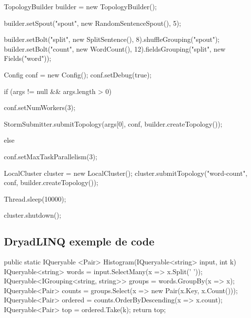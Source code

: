\begin{code}[Java]
{{        TopologyBuilder builder = new TopologyBuilder();

        builder.setSpout("spout", new RandomSentenceSpout(), 5);

        builder.setBolt("split", new SplitSentence(), 8).shuffleGrouping("spout");
        builder.setBolt("count", new WordCount(), 12).fieldsGrouping("split", new Fields("word"));

        Config conf = new Config();
        conf.setDebug(true);


        if (args != null && args.length > 0) {
          conf.setNumWorkers(3);

          StormSubmitter.submitTopology(args[0], conf, builder.createTopology());
        }
        else {
          conf.setMaxTaskParallelism(3);

          LocalCluster cluster = new LocalCluster();
          cluster.submitTopology("word-count", conf, builder.createTopology());

          Thread.sleep(10000);

          cluster.shutdown();
        }
      }
    }
  \end{code}

  \subsection{DryadLINQ exemple de code}
  \begin{code}[C]
    public static IQueryable <Pair> Histogram(IQueryable<string> input, int k) {
      IQueryable<string> words = input.SelectMany(x => x.Split(' '));
      IQueryable<IGrouping<string, string>> groups = words.GroupBy(x => x);
      IQueryable<Pair> counts = groups.Select(x => new Pair(x.Key, x.Count()));
      IQueryable<Pair> ordered = counts.OrderByDescending(x => x.count);
      IQueryable<Pair> top = ordered.Take(k);
      return top;
    }
  \end{code}

